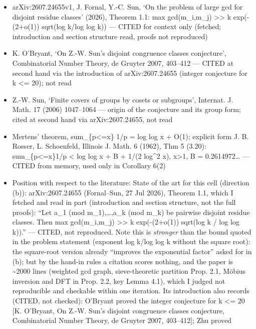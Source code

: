 \begin{itemize}
\tightlist
\item
  arXiv:2607.24655v1, J. Fornal, Y.-C. Sun, `On the problem of large gcd
  for disjoint residue classes' (2026), Theorem 1.1: max gcd(m\_i,m\_j)
  \textgreater\textgreater{} k exp(-(2+o(1)) sqrt(log k/log log k)) ---
  CITED for context only (fetched; introduction and section structure
  read, proofs not reproduced)
\item
  K. O'Bryant, `On Z.-W. Sun's disjoint congruence classes conjecture',
  Combinatorial Number Theory, de Gruyter 2007, 403--412 --- CITED at
  second hand via the introduction of arXiv:2607.24655 (integer
  conjecture for k \textless= 20); not read
\item
  Z.-W. Sun, `Finite covers of groups by cosets or subgroups', Internat.
  J. Math. 17 (2006) 1047--1064 --- origin of the conjecture and its
  group form; cited at second hand via arXiv:2607.24655, not read
\item
  Mertens' theorem, sum\_\{p\textless=x\} 1/p = log log x + O(1);
  explicit form J. B. Rosser, L. Schoenfeld, Illinois J. Math. 6 (1962),
  Thm 5 (3.20): sum\_\{p\textless=x\}1/p \textless{} log log x + B +
  1/(2 log\^{}2 x), x\textgreater1, B = 0.2614972\ldots{} --- CITED from
  memory, used only in Corollary 6(2)
\item
  Position with respect to the literature: State of the art for this
  cell (direction (b)): arXiv:2607.24655 (Fornal--Sun, 27 Jul 2026),
  Theorem 1.1, which I fetched and read in part (introduction and
  section structure, not the full proofs): ``Let a\_1 (mod
  m\_1),\ldots,a\_k (mod m\_k) be pairwise disjoint residue classes.
  Then max gcd(m\_i,m\_j) \textgreater\textgreater{} k exp(-(2+o(1))
  sqrt(log k / log log k)).'' --- CITED, not reproduced. Note this is
  \emph{stronger} than the bound quoted in the problem statement
  (exponent log k/log log k without the square root): the square-root
  version already ``improves the exponential factor'' asked for in (b);
  but by the hand-in rules a citation scores nothing, and the paper is
  \textasciitilde2000 lines (weighted gcd graph, sieve-theoretic
  partition Prop. 2.1, Möbius inversion and DFT in Prop. 2.2, key Lemma
  4.1), which I judged not reproducible and checkable within one
  iteration. Its introduction also records (CITED, not checked):
  O'Bryant proved the integer conjecture for k \textless= 20 {[}K.
  O'Bryant, On Z.-W. Sun's disjoint congruence classes conjecture,
  Combinatorial Number Theory, de Gruyter 2007, 403--412{]}; Zhu proved

\end{itemize}
